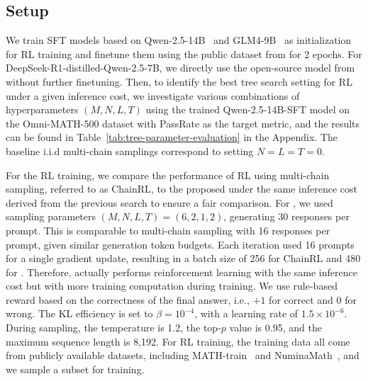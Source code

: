 \subsection{Setup}
\label{sec:exp_setup}
We train SFT models based on Qwen-2.5-14B~\citep{qwen2_5} and GLM4-9B~\citep{glm2024chatglm} as initialization for RL training and finetune them using the public dataset from \citep{hou2025advancing} for 2 epochs. 
For DeepSeek-R1-distilled-Qwen-2.5-7B, we directly use the open-source model from~\cite{guo2025deepseek} without further finetuning.
Then, to identify the best tree search setting for RL under a given inference cost, we investigate various combinations of hyperparameters $(M, N, L, T)$ using the trained Qwen-2.5-14B-SFT model on the Omni-MATH-500 dataset with PassRate as the target metric, and the results can be found in Table~\ref{tab:tree-parameter-evaluation} in the Appendix. 
The baseline i.i.d multi-chain samplings correspond to setting $N = L = T = 0$.

For the RL training, we compare the performance of RL using multi-chain sampling, referred to as ChainRL, to the proposed \model under the same inference cost derived from the previous search to ensure a fair comparison. 
For \model, we used sampling parameters $(M, N, L, T) = (6, 2, 1, 2)$, generating 30 responses per prompt. This is comparable to multi-chain sampling with 16 responses per prompt, given similar generation token budgets.  Each iteration used 16 prompts for a single gradient update, resulting in a batch size of 256 for ChainRL and 480 for \model. Therefore, \model actually performs reinforcement learning with the same inference cost but with more training computation during training. 
We use rule-based reward based on the correctness of the final answer, i.e., $+1$ for correct and $0$ for wrong.
The KL efficiency is set to $\beta = 10^{-4}$, with a learning rate of $1.5 \times 10^{-6}$. During sampling, the temperature is 1.2, the top-$p$ value is 0.95, and the maximum sequence length is 8,192.
For RL training, the training data all come from publicly available datasets, including MATH-train~\citep{hendrycksmath2021} and NuminaMath~\citep{li2024numinamath}, and we sample a subset for training.

